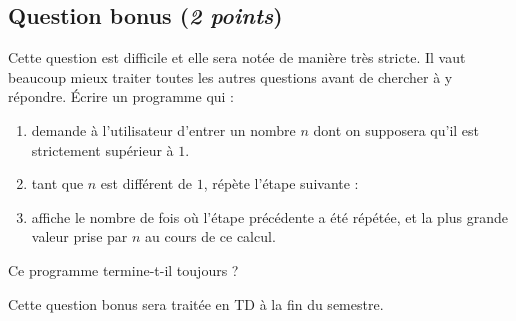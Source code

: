 \subsection*{Question bonus (\emph{2 points})}
 Cette question est difficile et elle sera notée de manière très stricte. Il vaut
beaucoup mieux traiter toutes les autres questions avant de chercher à y
répondre. 
 \question Écrire un programme qui :
\begin{enumerate}
\item  demande à l'utilisateur d'entrer un
nombre $n$ dont on supposera qu'il est strictement supérieur à $1$.
\item tant que $n$ est différent de $1$, répète l'étape suivante :

  \hfill{}

\item affiche le nombre de fois où l'étape précédente a été répétée,
et la plus grande valeur prise par $n$ au cours de ce calcul.
\end{enumerate}
Ce programme termine-t-il toujours ?

\begin{correction}
  Cette question bonus sera traitée en TD à la fin du semestre.
\end{correction}



